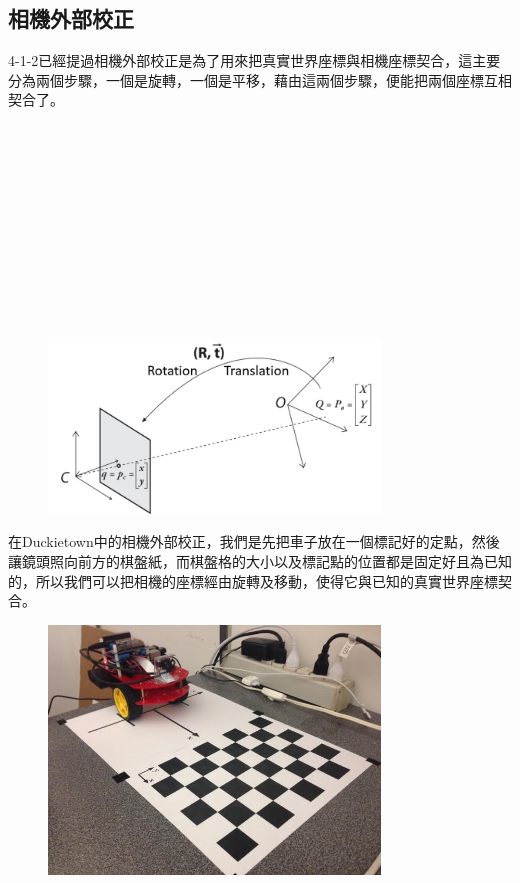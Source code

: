 \documentclass{article}
\begin{document}
\subsection{相機外部校正}

4-1-2已經提過相機外部校正是為了用來把真實世界座標與相機座標契合，這主要分為兩個步驟，一個是旋轉，一個是平移，藉由這兩個步驟，便能把兩個座標互相契合了。
\\\\\\\\\\\\\\\\\\\\\\\\
\begin{figure}[htp]
    \begin{center}
        \includegraphics[width=250pt]{pic/圖片13.jpg}
    \end{center}
\end{figure}

在Duckietown中的相機外部校正，我們是先把車子放在一個標記好的定點，然後讓鏡頭照向前方的棋盤紙，而棋盤格的大小以及標記點的位置都是固定好且為已知的，所以我們可以把相機的座標經由旋轉及移動，使得它與已知的真實世界座標契合。
\\
\begin{figure}[htp]
    \begin{center}
        \includegraphics[width=250pt]{pic/圖片14.jpg}
    \end{center}
\end{figure}
\end{document}
